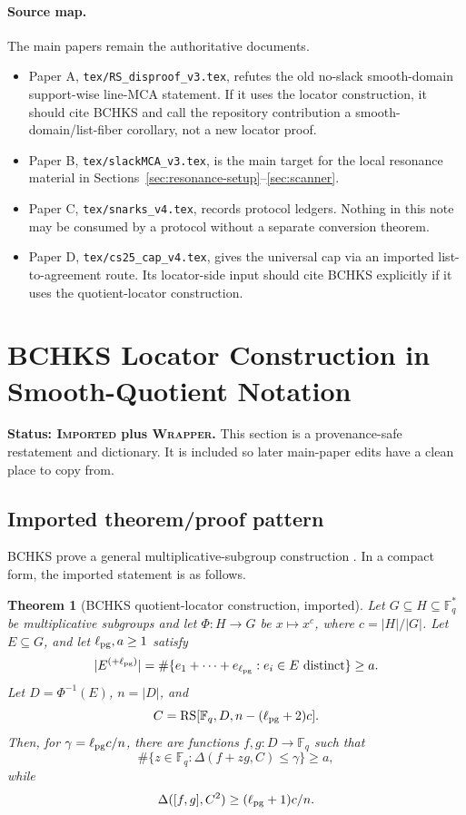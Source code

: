 \documentclass[11pt]{article}
\newtheorem{theorem}{Theorem}
\newcommand{\F}{\mathbb F}
\newcommand{\RS}{\operatorname{RS}}
\newcommand{\dist}{\Delta}
\newcommand{\ellpg}{\ell_{\rm pg}}
\begin{document}
\paragraph{Source map.}
The main papers remain the authoritative documents.
\begin{itemize}
\item Paper A, \texttt{tex/RS\_disproof\_v3.tex}, refutes the old no-slack
  smooth-domain support-wise line-MCA statement.  If it uses the locator
  construction, it should cite BCHKS and call the repository contribution a
  smooth-domain/list-fiber corollary, not a new locator proof.
\item Paper B, \texttt{tex/slackMCA\_v3.tex}, is the main target for the local
  resonance material in Sections~\ref{sec:resonance-setup}--\ref{sec:scanner}.
\item Paper C, \texttt{tex/snarks\_v4.tex}, records protocol ledgers.  Nothing
  in this note may be consumed by a protocol without a separate conversion
  theorem.
\item Paper D, \texttt{tex/cs25\_cap\_v4.tex}, gives the universal cap via an
  imported list-to-agreement route.  Its locator-side input should cite BCHKS
  explicitly if it uses the quotient-locator construction.
\end{itemize}

\section{BCHKS Locator Construction in Smooth-Quotient Notation}
\label{sec:bchks}

\textbf{Status: \textsc{Imported} plus \textsc{Wrapper}.}
This section is a provenance-safe restatement and dictionary.  It is included
so later main-paper edits have a clean place to copy from.

\subsection{Imported theorem/proof pattern}

BCHKS prove a general multiplicative-subgroup construction
\cite[Thm.~7.1]{BCHKS25}.  In a compact form, the imported statement is as
follows.

\begin{theorem}[BCHKS quotient-locator construction, imported]
\label{thm:bchks-import}
Let \(G\subseteq H\subseteq \F_q^*\) be multiplicative subgroups and let
\(\Phi:H\to G\) be \(x\mapsto x^c\), where \(c=|H|/|G|\).  Let
\(E\subseteq G\), and let \(\ellpg,a\geq1\) satisfy
\[
  |E^{(+\ellpg)}|
  =\#\{e_1+\cdots+e_{\ellpg}:e_i\in E\text{ distinct}\}\geq a.
\]
Let \(D=\Phi^{-1}(E)\), \(n=|D|\), and
\[
  C=\RS[\F_q,D,n-(\ellpg+2)c].
\]
Then, for \(\gamma=\ellpg c/n\), there are functions
\(f,g:D\to\F_q\) such that
\[
  \#\{z\in\F_q: \dist(f+zg,C)\leq \gamma\}\geq a,
\]
while
\[
  \dist([f,g],C^2)\geq (\ellpg+1)c/n.
\]
\end{theorem}
\end{document}
